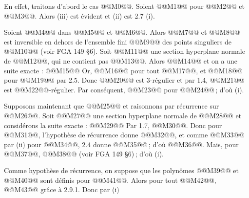 
En
effet, traitons d'abord le cas @@M0@@. Soient @@M1@@ pour @@M2@@ et @@M3@@. Alors (iii) est évident et (ii) est 2.7 (i).

Soient @@M4@@ dans @@M5@@ et @@M6@@. Alors @@M7@@ et @@M8@@ est inversible en dehors de l'ensemble fini @@M9@@ des points singuliers de @@M10@@ (voir FGA 149 \S 6). Soit @@M11@@ une section hyperplane normale de @@M12@@, qui ne contient pas @@M13@@. Alors @@M14@@ et on a une suite exacte :
@@M15@@
Or, @@M16@@ pour tout @@M17@@, et @@M18@@ pour @@M19@@ par 2.5. Donc @@M20@@ est 3-régulier et par 1.4, @@M21@@ est @@M22@@-régulier. Par conséquent, @@M23@@ pour @@M24@@\,; d'où (i).

Supposons maintenant que @@M25@@ et raisonnons par récurrence sur @@M26@@. Soit @@M27@@ une section hyperplane normale de @@M28@@ et considérons la suite exacte :
@@M29@@
Par 1.7, @@M30@@. Donc pour @@M31@@, l'hypothèse de récurrence donne @@M32@@, et comme @@M33@@ par (ii) pour @@M34@@, 2.4 donne @@M35@@\,; d'où @@M36@@. Mais, pour @@M37@@, @@M38@@ (voir FGA 149 \S 6)\,; d'où (i).

Comme hypothèse de récurrence, on suppose que les polynômes @@M39@@ et @@M40@@ sont définis pour @@M41@@. Alors pour tout @@M42@@, @@M43@@ grâce à 2.9.1. Donc par (i) 
